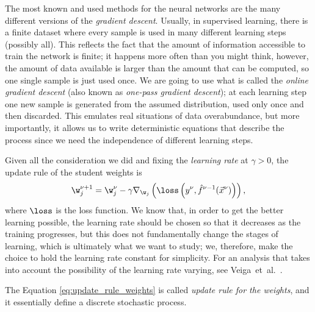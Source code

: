 The most known and used methods for the neural networks are the many different 
versions of the \emph{gradient descent}. Usually, in supervised learning,
there is a finite dataset where every sample is used in many different learning
steps (possibly all). This reflects the fact that the amount of information accessible
to train the network is finite; it happens more often than you might think, however,
the amount of data available is larger than the amount that can be computed, so one single sample is just used once.
We are going to use what is called the \emph{online gradient descent}
(also known as \emph{one-pass gradient descent}); at each learning step one new sample
is generated from the assumed distribution, used only once and then discarded.
This emulates real situations of data overabundance, but more importantly, it allows us
to write deterministic equations that describe the process since we need the independence
of different learning steps.

Given all the consideration we did and fixing the \emph{learning rate} at \(\gamma>0\),
the update rule of the student weights is
\begin{equation} \label{eq:update_rule_weights}
  \w^{\nu+1}_j = \w^{\nu}_j - \gamma \nabla_{\w_j}\left(\loss\left(y^\nu,\hat{f}^{\nu-1}{\left(\vec{x}^\nu\right)}\right)\right),
\end{equation}
where \(\loss\) is the loss function.
We know that, in order to get the better learning possible, the learning rate should
be chosen so that it decreases as the training progresses, but this does not fundamentally change the stages of learning,
which is ultimately what we want to study; we, therefore, make the choice to hold the learning rate constant for simplicity.
For an analysis that takes into account the possibility of the learning rate varying, see Veiga~et~al.~\cite{veiga2022phase}.

The Equation \eqref{eq:update_rule_weights} is called \emph{update rule for the weights},
and it essentially define a discrete stochastic process. %

